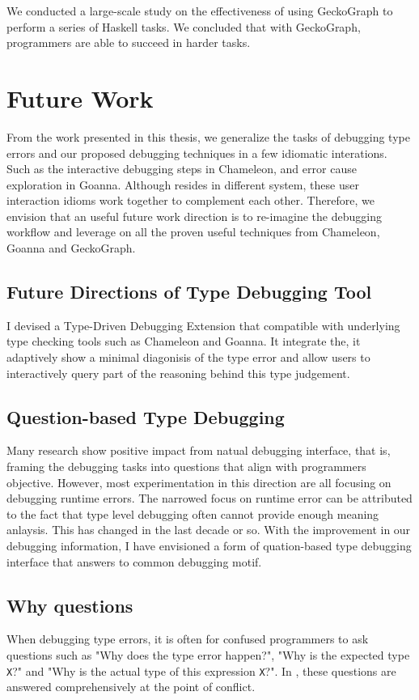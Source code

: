 We conducted a large-scale study on the effectiveness of using GeckoGraph to perform a series of Haskell tasks. We concluded that with GeckoGraph, programmers are able to succeed in harder tasks.

\section{Future Work}

From the work presented in this thesis, we generalize the tasks of debugging type errors and our proposed debugging techniques in a few idiomatic interations.  Such as the interactive debugging steps in Chameleon, and error cause exploration in Goanna. Although resides in different system, these user interaction idioms work together to complement each other. Therefore, we envision that an useful future work direction is to re-imagine the debugging workflow and leverage on all the proven useful techniques from Chameleon, Goanna and GeckoGraph.

\subsection{Future Directions of Type Debugging Tool}

I devised a Type-Driven Debugging Extension that compatible with underlying type checking tools such as Chameleon and Goanna.  It integrate the, it adaptively show a minimal diagonisis of the type error and allow users to interactively query part of the reasoning behind this type judgement.  

\subsection{Question-based Type Debugging}
Many research show positive impact from natual debugging interface, that is,  framing the debugging tasks into questions that align with programmers objective. However, most experimentation in this direction are all focusing on debugging runtime errors. The narrowed focus on runtime error can be attributed to the fact that type level debugging often cannot provide enough meaning anlaysis. This has changed in the last decade or so. With the improvement in our debugging information, I have envisioned a form of quation-based type debugging interface that answers to common debugging motif. 

\subsection{Why questions}
When debugging type errors, it is often for confused programmers to ask questions such as "Why does the type error happen?", "Why is the expected type \texttt{X}?" and "Why is the actual type of this expression \texttt{X}?".  In \toolname{}, these questions are answered comprehensively at the point of conflict. 

